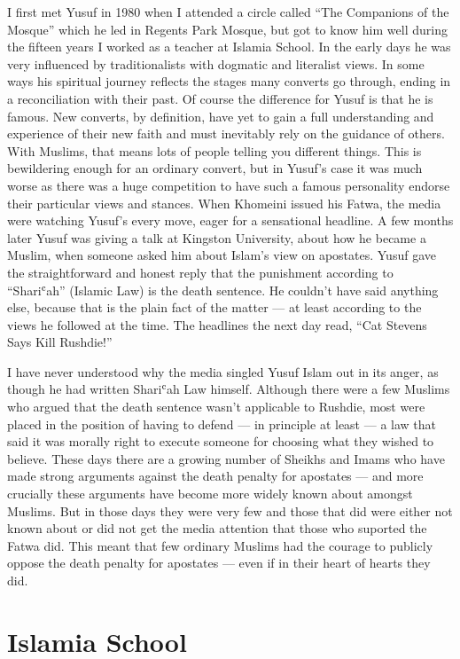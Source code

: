 \documentclass[12pt]{memoir}
\def\`{ʿ} %
\begin{document}
I first met Yusuf in 1980 when I attended a circle called
“The Companions of the Mosque” which he led in Regents Park Mosque,
but got to know him well during the fifteen years
I worked as a teacher at Islamia School.
In the early days he was very influenced by traditionalists
with dogmatic and literalist views.
In some ways his spiritual journey reflects the stages
many converts go through, ending in a reconciliation with their past.
Of course the difference for Yusuf is that he is famous.
New converts, by definition, have yet to gain a full understanding
and experience of their new faith
and must inevitably rely on the guidance of others.
With Muslims, that means lots of people telling you different things.
This is bewildering enough for an ordinary convert,
but in Yusuf’s case it was much worse as there was a huge competition
to have such a famous personality endorse their particular views and stances.
When Khomeini issued his Fatwa, the media were watching Yusuf’s every move,
eager for a sensational headline.
A few months later Yusuf was giving a talk at Kingston University,
about how he became a Muslim,
when someone asked him about Islam’s view on apostates.
Yusuf gave the straightforward and honest reply
that the punishment according to “Shari\`ah” (Islamic Law)
is the death sentence.
He couldn’t have said anything else,
because that is the plain fact of the matter —
at least according to the views he followed at the time.
The headlines the next day read, “Cat Stevens Says Kill Rushdie!”

I have never understood why the media singled Yusuf Islam out in its anger,
as though he had written Shari\`ah Law himself.
Although there were a few Muslims who argued that the death sentence
wasn’t applicable to Rushdie,
most were placed in the position of having to defend —
in principle at least —
a law that said it was morally right to execute someone
for choosing what they wished to believe.
These days there are a growing number of Sheikhs and Imams
who have made strong arguments against the death penalty for apostates —
and more crucially these arguments have become
more widely known about amongst Muslims.
But in those days they were very few and those that did
were either not known about or did not get
the media attention that those who suported the Fatwa did.
This meant that few ordinary Muslims had the courage
to publicly oppose the death penalty for apostates —
even if in their heart of hearts they did.


\chapter{Islamia School}
\end{document}
